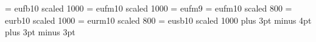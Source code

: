 \documentclass[11pt]{article}
\begin{document}
\font\euf = eufb10 scaled 1000
\font\eufm = eufm10 scaled 1000
\font\eufmi = eufm9
\font\eufms = eufm10 scaled 800
\font\eufr = eurb10 scaled 1000
\font\eufmr = eurm10 scaled 800
\font\eus = eusb10 scaled 1000
\abovedisplayskip=5pt plus 3pt minus 4pt
\belowdisplayskip=5pt plus 3pt minus 3pt
\rm
\def\Beta{{\cal B}}
\def\A{{\cal A}}
\def\a{\mbox{\bf a}}
\def\abi{\mbox{\textbf{\textit a}}}
\def\abis{\mbox{\textbf{\scriptsize\textit a}}}
\def\as{\mbox{\small\bf a}}
\def\av{\vec{a}}
\def\AA{\mbox{\eus A}}
\def\Aa{\mbox{\eufm A}}
\def\Ab{\mbox{\bf A}}
\def\Abi{\mbox{\textbf{\textit A}}}
\def\Abs{\mbox{\textbf{\scriptsize A}}}
\def\Abis{\mbox{\textbf{\scriptsize\textit A}}}
\def\alphab{{\boldsymbol \alpha}}
\def\B{{\cal B}}
\def\BB{{\eus B}}
\def\Bb{\mbox{\bf B}}
\def\Bbi{\mbox{\textbf{\textit B}}}
\def\Bf{\mbox{\eufm B}}
\def\Bfi{\mbox{\eufmi B}}
\def\Bi{\mbox{Bi}}
\def\Bbis{\mbox{\textbf{\scriptsize\textit B}}}
\def\bbi{\mbox{\textbf{\textit b}}}
\def\bbis{\mbox{\textbf{\scriptsize\textit b}}}
\def\betab{{\boldsymbol \beta}}
\def\b{\mbox{\bf b}}
\def\bs{\mbox{\small\bf b}}
\def\Chi{\mbox{\eufm X}}
\def\Chis{\mbox{\eufms X}}
\def\C{\mbox{\bf C}}
\def\Cb{\mbox{\bf C}}
\def\Cbm{\mbox{\scriptsize\bf C}}
\def\Cbi{\mbox{\textbf{\textit C}}}
\def\cb{\mbox{\bf c}}
\def\cbi{\mbox{\textbf{\textit c}}}
\def\c{\mbox{\bf c}}
\def\CC{{\eus C}}
\def\Cc{\mbox{\eufm С}}
\def\Dbi{\mbox{\textbf{\textit D}}}
\def\Dd{\mbox{\eufm D}}
\def\DD{\mbox{\cal D}\,}
\def\D{{\mathbb D}}
\def\Db{\mbox{\bf D}}
\def\DE{\mbox{DE}\,}
\def\Deltab{{\boldsymbol \Delta}}
\def\db{\mbox{\bf d}} %
\def\dbs{\mbox{\bf\scriptsize d}}
\def\dn{\mbox{d}}
\def\dns{\mbox{\scriptsize d}}
\def\E{{\mathbb E}}
\def\Eb{\mbox{\bf E}\,}
\def\Ex{\mbox{E}\,}
\def\Exp{\mbox{E}}
\def\e{\mbox{\textbf{\textit e}}}
\def\etab{{\boldsymbol \eta}}
\def\epsilonb{\mbox{\textbf{\textit e}}}
\def\F{{\mathbb F}}
\def\Fa{{\eus F}}
\def\Ff{\mbox{\eufm F}}
\def\Ffi{\mbox{\eufmi F}}
\def\Ft{{\bf A}}
\def\Fb{\mbox{\bf F}}
\def\fb{{\bf f}}
\def\fbi{\mbox{\textbf{\textit f}}}
\def\Fc{{\cal F}}
\def\G{{\bf G}}
\def\g{{\mbox{\bf g}}}
\def\Gbi{\mbox{\textbf{\textit G}}}
\def\gbi{\mbox{\textbf{\textit g}}}
\def\Gammab{{\boldsymbol \Gamma}}
\def\gammab{{\boldsymbol \gamma}}
\def\gm{{\mbox{\bf\small g}}}
\def\Geom{\mbox{Geom}}
\def\H{{\bf H}}
\def\Hbi{\mbox{\textbf{\textit H}}}
\def\h{{\mbox{\bf h}}}
\def\hbi{\mbox{\textbf{\textit h}}}
\def\hm{{\mbox{\bf\small h}}}
\end{document}
